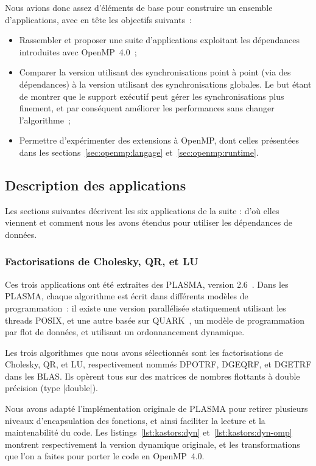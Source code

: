 Nous avions donc assez d'éléments de base pour construire un ensemble d'applications, avec en tête les objectifs suivants~:
\begin{itemize}
  \item Rassembler et proposer une suite d'applications exploitant les dépendances introduites avec OpenMP~4.0~;
  \item Comparer la version utilisant des synchronisations point à point (via des dépendances) à la version utilisant des synchronisations globales. Le but étant de montrer que le support exécutif peut gérer les synchronisations plus finement, et par conséquent améliorer les performances sans changer l'algorithme~;
  \item Permettre d'expérimenter des extensions à OpenMP, dont celles présentées dans les sections~\ref{sec:openmp:langage} et~\ref{sec:openmp:runtime}.
\end{itemize}

\subsection{Description des applications}

Les sections suivantes décrivent les six applications de la suite : d'où elles viennent et comment nous les avons étendus pour utiliser les dépendances de données.

\subsubsection{Factorisations de Cholesky, QR, et LU}

Ces trois applications ont été extraites des PLASMA, version 2.6~\cite{PLASMA2.6}.
Dans les PLASMA, chaque algorithme est écrit dans différents modèles de programmation~: il existe une version parallélisée statiquement utilisant les threads POSIX, et une autre basée sur QUARK~\cite{YarKhan2011}, un modèle de programmation par flot de données, et utilisant un ordonnancement dynamique.

Les trois algorithmes que nous avons sélectionnés sont les factorisations de Cholesky, QR, et LU, respectivement nommés DPOTRF, DGEQRF, et DGETRF dans les BLAS.
Ils opèrent tous sur des matrices de nombres flottants à double précision (type |double|).

Nous avons adapté l'implémentation originale de PLASMA pour retirer plusieurs niveaux d'encapsulation des fonctions, et ainsi faciliter la lecture et la maintenabilité du code.
Les listings~\ref{lst:kastors:dyn} et~\ref{lst:kastors:dyn-omp} montrent respectivement la version dynamique originale, et les transformations que l'on a faites pour porter le code en OpenMP~4.0.

